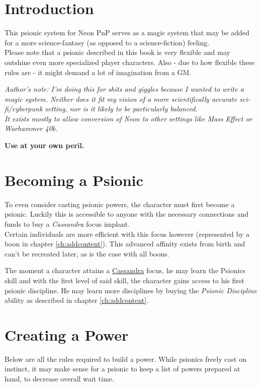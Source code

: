 \documentclass[12pt,a4paper,openany,usenames,dvipsnames]{book}
\begin{document}
	

	\chapter{Introduction}
	This psionic system for Neon PnP serves as a magic system that may be added for a more science-fantasy (as opposed to a science-fiction) feeling.\\
	Please note that a psionic described in this book is very flexible and may outshine even more specialized player characters. Also - due to how flexible these rules are - it might demand a lot of imagination from a GM.

	\begin{exampleblock}
		\itshape
		Author's note: I'm doing this for shits and giggles because I wanted to write a magic system.
		Neither does it fit my vision of a more scientifically accurate sci-fi/cyberpunk setting, nor is it likely to be particularly balanced.\\
		It exists mostly to allow conversion of Neon to other settings like Mass Effect or Warhammer 40k.
		\par
		\textbf{Use at your own peril.}
	\end{exampleblock}

	\chapter{Becoming a Psionic}
	To even consider casting psionic powers, the character must first become a psionic. Luckily this is accessible to anyone with the necessary connections and funds to buy a \emph{Cassandra} focus implant.\\
	Certain individuals are more efficient with this focus however (represented by a boon in chapter \ref{ch:addcontent}). This advanced affinity exists from birth and can't be recreated later, as is the case with all boons. \par
	The moment a character attains a \hyperref[cassimplant]{Cassandra} focus, he may learn the Psionics skill and with the first level of said skill, the character gains access to his first psionic discipline. He may learn more disciplines by buying the \emph{Psionic Discipline} ability as described in chapter \ref{ch:addcontent}.

	\chapter{Creating a Power}
	\label{ch:create}
	Below are all the rules required to build a power.
	While psionics freely cast on instinct, it may make sense for a psionic to keep a list of powers prepared at hand, to decrease overall wait time.
\end{document}
